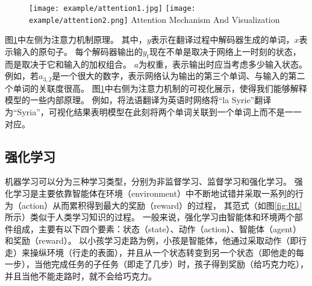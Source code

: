 \begin{figure}[htbp]
  \centering
  \texttt{[image: example/attention1.jpg]}
  \texttt{[image: example/attention2.png]}
    {Attention Mechanism And Visualization}
\label{fig:attention}
\end{figure}

图\ref{fig:attention}中左侧为注意力机制原理。
其中，$y$表示在翻译过程中解码器生成的单词，$x$表示输入的原句子。
每个解码器输出的$y_t$现在不单是取决于网络上一时刻的状态，而是取决于它和输入的加权组合。
$a$为权重，表示输出时应当考虑多少输入状态。
例如，若$a_{3,2}$是一个很大的数字，表示网络认为输出的第三个单词、与输入的第二个单词的关联度很高。
图\ref{fig:attention}中右侧为注意力机制的可视化展示，使得我们能够解释模型的一些内部原理。
例如，将法语翻译为英语时网络将“la Syrie”翻译为“Syria”，可视化结果表明模型在此刻将两个单词关联到一个单词上而不是一一对应。


\subsection{强化学习}

机器学习可以分为三种学习类型，分别为非监督学习、监督学习和强化学习。
强化学习是主要依靠智能体在环境（environment）中不断地试错并采取一系列的行为（action）从而累积得到最大的奖励（reward）的过程，
其范式（如图\ref{fig:RL}所示）类似于人类学习知识的过程。
一般来说，强化学习由智能体和环境两个部件组成，主要有以下四个要素：状态（state）、动作（action）、智能体（agent）和奖励（reward）。
以小孩学习走路为例，小孩是智能体，他通过采取动作（即行走）来操纵环境（行走的表面），并且从一个状态转变到另一个状态（即他走的每一步），当他完成任务的子任务（即走了几步）时，孩子得到奖励（给巧克力吃），并且当他不能走路时，就不会给巧克力。

